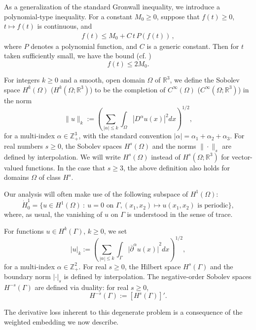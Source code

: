 \documentclass[12pt,twoside,reqno]{amsart}
\numberwithin{equation}{section}
\theoremstyle{definition}
\theoremstyle{remark}
\begin{document}
As a generalization of the standard Gronwall inequality, we introduce a polynomial-type inequality. For a constant $M_0{\geqslant} 0$,  suppose that $f(t){\geqslant} 0$,
$t \mapsto f(t)$ is continuous,  and
\begin{align}\label{f}
f(t) {\leqslant} M_0 + C\,t\, P(f(t))\,,
\end{align}
where $P$ denotes a polynomial function,  and  $C$ is a generic constant.
Then for $t$ taken sufficiently small, we have the bound  (cf. \cite{CLS10,CS06})
$$
f(t) {\leqslant} 2M_0.
$$

For integers $k{\geqslant} 0$ and a smooth, open domain $\Omega$ of ${\mathbb R}^3$,
we define the Sobolev space $H^k(\Omega)$ ($H^k(\Omega; {\mathbb R}^3)$) to
be the completion of $C^\infty(\Omega)$ ($C^\infty(\Omega; {\mathbb R}^3)$)
in the norm
$$\|u\|_k := \left( \sum_{|\alpha|\le k}\int_\Omega \left|   D^\alpha u(x)
\right|^2 dx\right)^{1/2},$$
for a multi-index $\alpha \in {\mathbb Z}^3_+$, with the standard convention   $|\alpha|=\alpha_1 +\alpha_2+ \alpha_3$.
For real numbers $s{\geqslant} 0$, the Sobolev spaces $H^s(\Omega)$ and the norms $\| \cdot \|_s$ are defined by interpolation.
We will  write $H^s(\Omega)$ instead of $H^s(\Omega;{\mathbb R} ^3)$
for vector-valued functions.  In the case that $s{\geqslant} 3$, the above definition also holds for domains $\Omega$  of class $H^s$.

Our analysis will often make use of the following subspace of $H^1(\Omega)$:
$$
\dot{H}_0^1 = \{ u \in H^1(\Omega) \ : \  u=0 \text{ on } {\Gamma}, (x_1,x_2) \mapsto u(x_1,x_2) \text{ is periodic} \},
$$
where, as usual, the vanishing of $u$ on ${\Gamma}$ is understood in the sense of trace.

For  functions $u\in H^k({\Gamma})$, $k {\geqslant} 0$,  we set
$$|u|_k := \left( \sum_{|\alpha|{\leqslant} k}\int_{\Gamma} {\vert{  {\overline{\partial}}^\alpha  u(x)
}\vert}^2 dx\right)^{1/2},$$
for a multi-index $\alpha  \in {\mathbb Z}^2_+$.   For real $s {\geqslant} 0$, the Hilbert space $H^s({\Gamma})$ and the boundary norm $| \cdot |_s$ is defined by interpolation.  The negative-order Sobolev spaces $H^{-s}({\Gamma})$ are defined via duality: for  real $s {\geqslant} 0$,
$$
H^{-s}({\Gamma}) := [ H^s({\Gamma})]'.
$$

The derivative loss inherent to this degenerate problem is a consequence of the weighted embedding we now describe.
\end{document}

